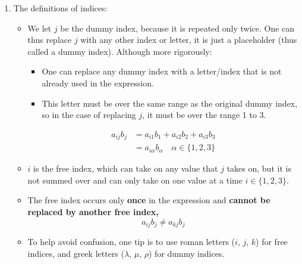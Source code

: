 \begin{enumerate}[label=\textbf{Rule \arabic*}:, leftmargin=*, labelsep=1em]
    \item The definitions of indices:
          \begin{itemize}
              \item We let $j$ be the dummy index, because it is repeated only twice. One can thus replace $j$ with any other index or letter, it is just a placeholder (thus called a dummy index). Although more rigorously:
                    \begin{itemize}
                        \item One can replace any dummy index with a letter/index that is not already used in the expression.
                        \item This letter must be over the same range as the original dummy index, so in the case of replacing $j$, it must be over the range 1 to 3.
                    \end{itemize}
                    \begin{align}
                        a_{ij} b_{j} & = a_{i1}b_1 + a_{i2}b_2 + a_{i3}b_3               \\
                                     & = a_{i\alpha} b_\alpha \quad \alpha \in \{1,2,3\}
                    \end{align}
              \item $i$ is the free index, which can take on any value that $j$ takes on, but it is not summed over and can only take on one value at a time $i \in \{1,2,3\}$.
              \item The free index occurs only \textbf{once} in the expression and \textbf{cannot be replaced by another free index,}
                    \begin{equation}
                        a_{ij} b_{j} \neq a_{kj} b_{j}
                    \end{equation}
              \item To help avoid confusion, one tip is to use roman letters ($i$, $j$, $k$) for free indices, and greek letters ($\lambda$, $\mu$, $\rho$) for dummy indices.


\end{itemize}
\end{enumerate}
